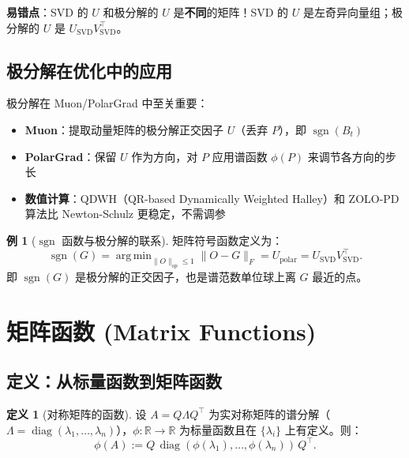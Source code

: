 \documentclass[12pt,a4paper]{ctexart}
\theoremstyle{definition}
\newtheorem{definition}{定义}[section]
\newtheorem{example}{例}[section]
\theoremstyle{plain}
\newcommand{\R}{\mathbb{R}}
\newcommand{\diag}{\operatorname{diag}}
\DeclareMathOperator*{\argmin}{arg\,min}
\DeclareMathOperator{\sgn}{sgn}
\begin{document}
\textbf{易错点}：SVD 的 $U$ 和极分解的 $U$ 是\textbf{不同}的矩阵！SVD 的 $U$ 是左奇异向量组；极分解的 $U$ 是 $U_{\text{SVD}}V_{\text{SVD}}^\top$。

\subsection{极分解在优化中的应用}

极分解在 Muon/PolarGrad 中至关重要：

\begin{itemize}
  \item \textbf{Muon}：提取动量矩阵的极分解正交因子 $U$（丢弃 $P$），即 $\sgn(B_t)$
  \item \textbf{PolarGrad}：保留 $U$ 作为方向，对 $P$ 应用谱函数 $\phi(P)$ 来调节各方向的步长
  \item \textbf{数值计算}：QDWH（QR-based Dynamically Weighted Halley）和 ZOLO-PD 算法比 Newton-Schulz 更稳定，不需调参
\end{itemize}

\begin{example}[$\sgn$ 函数与极分解的联系]
  矩阵符号函数定义为：
  \[
    \sgn(G) = \argmin_{\|O\|_{op}\le 1} \|O-G\|_F = U_{\text{polar}} = U_{\text{SVD}}V_{\text{SVD}}^\top.
  \]
  即 $\sgn(G)$ 是极分解的正交因子，也是谱范数单位球上离 $G$ 最近的点。
\end{example}

\section{矩阵函数 (Matrix Functions)}

\subsection{定义：从标量函数到矩阵函数}

\begin{definition}[对称矩阵的函数]
  设 $A=Q\Lambda Q^\top$ 为实对称矩阵的谱分解（$\Lambda=\diag(\lambda_1,\ldots,\lambda_n)$），$\phi:\R\to\R$ 为标量函数且在 $\{\lambda_i\}$ 上有定义。则：
  \begin{equation}\label{eq:matrix-func}
    \phi(A) := Q\,\diag(\phi(\lambda_1),\ldots,\phi(\lambda_n))\,Q^\top.
  \end{equation}
\end{definition}
\end{document}
